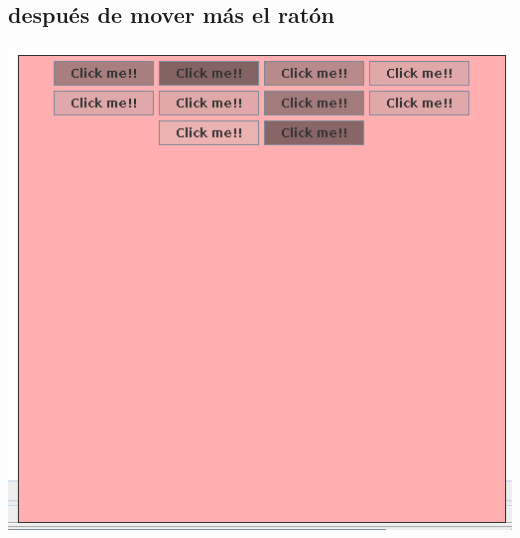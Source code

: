 \documentclass[12pt]{article}
\begin{document}
\subsection*{después de mover más el ratón}
\includegraphics[width=\textwidth]{Ejecucion3.png}
\end{document}
